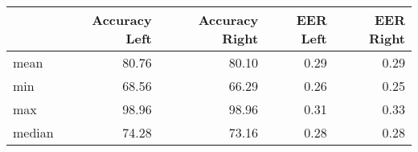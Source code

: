 \begin{tabular}{lrrrr}
\toprule
{} &  Accuracy Left &  Accuracy Right &  EER Left &  EER Right \\
\midrule
mean   &          80.76 &           80.10 &      0.29 &       0.29 \\
min    &          68.56 &           66.29 &      0.26 &       0.25 \\
max    &          98.96 &           98.96 &      0.31 &       0.33 \\
median &          74.28 &           73.16 &      0.28 &       0.28 \\
\bottomrule
\end{tabular}

